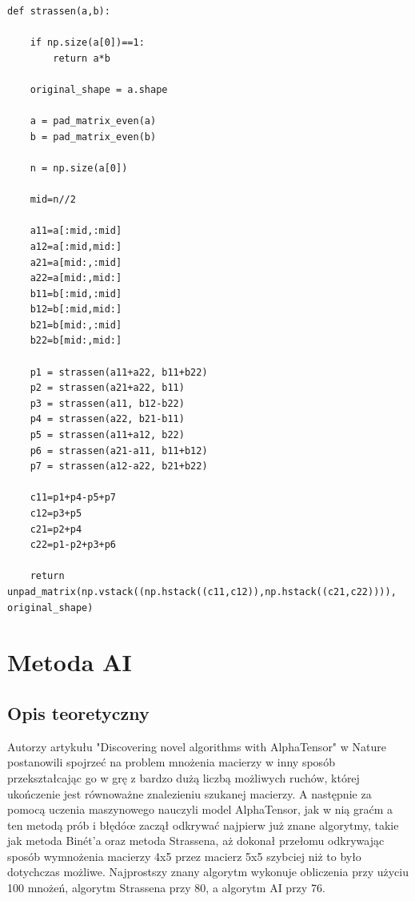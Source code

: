\documentclass{article}
\begin{document}
\begin{verbatim}
def strassen(a,b):
    
    if np.size(a[0])==1:
        return a*b
    
    original_shape = a.shape
    
    a = pad_matrix_even(a)
    b = pad_matrix_even(b)
    
    n = np.size(a[0])
    
    mid=n//2
    
    a11=a[:mid,:mid]
    a12=a[:mid,mid:]
    a21=a[mid:,:mid]
    a22=a[mid:,mid:]
    b11=b[:mid,:mid]
    b12=b[:mid,mid:]
    b21=b[mid:,:mid]
    b22=b[mid:,mid:]

    p1 = strassen(a11+a22, b11+b22)
    p2 = strassen(a21+a22, b11)
    p3 = strassen(a11, b12-b22)
    p4 = strassen(a22, b21-b11)
    p5 = strassen(a11+a12, b22)
    p6 = strassen(a21-a11, b11+b12)
    p7 = strassen(a12-a22, b21+b22)

    c11=p1+p4-p5+p7
    c12=p3+p5
    c21=p2+p4
    c22=p1-p2+p3+p6

    return unpad_matrix(np.vstack((np.hstack((c11,c12)),np.hstack((c21,c22)))), original_shape)
\end{verbatim}

\section{Metoda AI}

\subsection{Opis teoretyczny}

Autorzy artykułu "Discovering novel algorithms with AlphaTensor" w Nature postanowili spojrzeć na problem mnożenia macierzy w inny sposób przekształcając go w grę z bardzo dużą liczbą możliwych ruchów, której ukończenie jest równoważne znalezieniu szukanej macierzy. A następnie za pomocą uczenia maszynowego nauczyli model AlphaTensor, jak w nią graćm a ten metodą prób i błędóœ zaczął odkrywać najpierw już znane algorytmy, takie jak metoda Binét’a oraz metoda Strassena, aż dokonał przełomu odkrywając sposób wymnożenia macierzy 4x5 przez macierz 5x5 szybciej niż to było dotychczas możliwe. Najprostszy znany algorytm wykonuje obliczenia przy użyciu 100 mnożeń, algorytm Strassena przy 80, a algorytm AI przy 76.
\bigbreak
\end{document}
